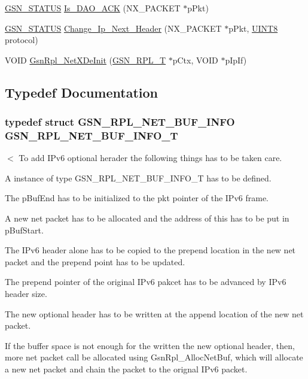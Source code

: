 \begin{DoxyCompactItemize}
\item 
\hyperlink{a00660_gada5951904ac6110b1fa95e51a9ddc217}{GSN\_\-STATUS} \hyperlink{a00580_af14343ebb4ece78c218bd6e29819b387}{Is\_\-DAO\_\-ACK} (NX\_\-PACKET $\ast$pPkt)
\item 
\hyperlink{a00660_gada5951904ac6110b1fa95e51a9ddc217}{GSN\_\-STATUS} \hyperlink{a00580_a67b5b82bc97607060b80726afeba2ce9}{Change\_\-Ip\_\-Next\_\-Header} (NX\_\-PACKET $\ast$pPkt, \hyperlink{a00660_gab27e9918b538ce9d8ca692479b375b6a}{UINT8} protocol)
\item 
VOID \hyperlink{a00580_a2e47be9b08f38443968a26763f067891}{GsnRpl\_\-NetXDeInit} (\hyperlink{a00192}{GSN\_\-RPL\_\-T} $\ast$pCtx, VOID $\ast$pIpIf)
\end{DoxyCompactItemize}


\subsection{Typedef Documentation}
\hypertarget{a00580_a489578eb1ef10ebcd7f4353f4d1af7b1}{
\subsubsection[{GSN\_\-RPL\_\-NET\_\-BUF\_\-INFO\_\-T}]{\setlength{\rightskip}{0pt plus 5cm}typedef struct {\bf GSN\_\-RPL\_\-NET\_\-BUF\_\-INFO} {\bf GSN\_\-RPL\_\-NET\_\-BUF\_\-INFO\_\-T}}}
\label{a00580_a489578eb1ef10ebcd7f4353f4d1af7b1}
$<$ To add IPv6 optional herader the following things has to be taken care.
\begin{DoxyItemize}
\item A instance of type GSN\_\-RPL\_\-NET\_\-BUF\_\-INFO\_\-T has to be defined.
\item The pBufEnd has to be initialized to the pkt pointer of the IPv6 frame.
\item A new net packet has to be allocated and the address of this has to be put in pBufStart.
\item The IPv6 header alone has to be copied to the prepend location in the new net packet and the prepend point has to be updated.
\item The prepend pointer of the original IPv6 pakcet has to be advanced by IPv6 header size.
\item The new optional header has to be written at the append location of the new net packet.
\item If the buffer space is not enough for the written the new optional header, then, more net packet call be allocated using GsnRpl\_\-AllocNetBuf, which will allocate a new net packet and chain the packet to the orignal IPv6 packet.
\end{DoxyItemize}

